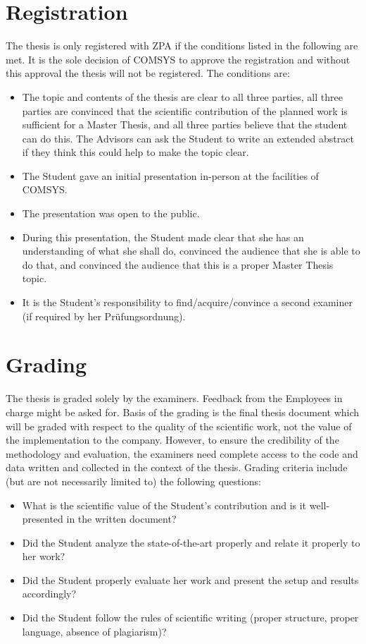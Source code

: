 \documentclass[noaccount,foldmarks,list,nomfg,english,nodate]{style/comsys-letter}
\def\thesisType{Master}
\def\hisHer{his/her}
\def\heShe{he/she}
\def\heSheThey{he/she/they}
\def\comsysThirdPersonS{(s)}
\def\comsysPluralS{(s)}
\def\companyPluralS{(s)}
\def\hisHer{his}
\def\heShe{he}
\def\hisHer{her}
\def\heShe{she}
\def\heSheThey{he}
\def\comsysThirdPersonS{s}
\def\comsysPluralS{}
\def\heSheThey{she}
\def\comsysThirdPersonS{s}
\def\comsysPluralS{}
\def\heSheThey{they}
\def\comsysThirdPersonS{}
\def\comsysPluralS{s}
\def\companyPluralS{}
\def\companyPluralS{}
\def\companyPluralS{s}
\begin{document}
\section{Registration}

The thesis is only registered with ZPA if the conditions listed in the following are met.
It is the sole decision of COMSYS to approve the registration and without this approval the thesis will not be registered.
The conditions are:
\begin{itemize}
	\item The topic and contents of the thesis are clear to all three parties, all three parties are convinced that the scientific contribution of the planned work is sufficient for a \thesisType{} Thesis, and all three parties believe that the student can do this.
		The Advisor\comsysPluralS{} can ask the Student to write an extended abstract if \heSheThey{} think\comsysThirdPersonS{} this could help to make the topic clear.
	\item The Student gave an initial presentation in-person at the facilities of COMSYS.
	\item The presentation was open to the public.
	\item During this presentation, the Student made clear that \heShe{} has an understanding of what \heShe{} shall do, convinced the audience that \heShe{} is able to do that, and convinced the audience that this is a proper \thesisType{} Thesis topic.
	\item It is the Student's responsibility to find/acquire/convince a second examiner (if required by \hisHer{} Prüfungsordnung).
\end{itemize}

\section{Grading}

The thesis is graded solely by the examiners.
Feedback from the Employee\companyPluralS{} in charge might be asked for.
Basis of the grading is the final thesis document which will be graded with respect to the quality of the scientific work, not the value of the implementation to the company.
However, to ensure the credibility of the methodology and evaluation, the examiners need complete access to the code and data written and collected in the context of the thesis.
Grading criteria include (but are not necessarily limited to) the following questions:
\begin{itemize}
	\item What is the scientific value of the Student's contribution and is it well-presented in the written document?
	\item Did the Student analyze the state-of-the-art properly and relate it properly to \hisHer{} work?
	\item Did the Student properly evaluate \hisHer{} work and present the setup and results accordingly?
	\item Did the Student follow the rules of scientific writing (proper structure, proper language, absence of plagiarism)?
\end{itemize}
\end{document}
